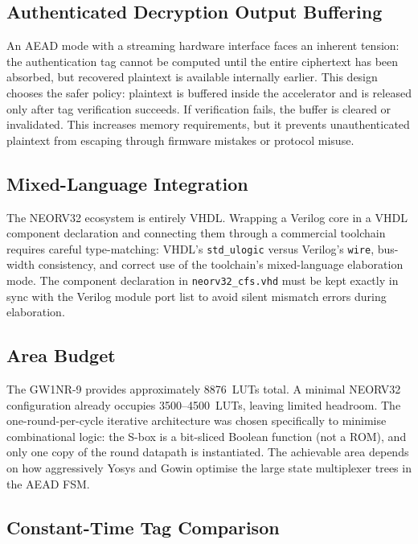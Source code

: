 \documentclass[11pt,a4paper]{article}
\begin{document}
\subsection{Authenticated Decryption Output Buffering}

An AEAD mode with a streaming hardware interface faces an inherent tension:
the authentication tag cannot be computed until the entire ciphertext has been
absorbed, but recovered plaintext is available internally earlier. This design
chooses the safer policy: plaintext is buffered inside the accelerator and is
released only after tag verification succeeds. If verification fails, the
buffer is cleared or invalidated. This increases memory requirements, but it
prevents unauthenticated plaintext from escaping through firmware mistakes or
protocol misuse.

\subsection{Mixed-Language Integration}

The NEORV32 ecosystem is entirely VHDL. Wrapping a Verilog core in a VHDL
component declaration and connecting them through a commercial toolchain
requires careful type-matching: VHDL's \texttt{std\_ulogic} versus Verilog's
\texttt{wire}, bus-width consistency, and correct use of the toolchain's
mixed-language elaboration mode. The component declaration in
\texttt{neorv32\_cfs.vhd} must be kept exactly in sync with the Verilog
module port list to avoid silent mismatch errors during elaboration.

\subsection{Area Budget}

The GW1NR-9 provides approximately 8876~LUTs total. A minimal NEORV32
configuration already occupies 3500--4500~LUTs, leaving limited headroom.
The one-round-per-cycle iterative architecture was chosen specifically to
minimise combinational logic: the S-box is a bit-sliced Boolean function
(not a ROM), and only one copy of the round datapath is instantiated.
The achievable area depends on how aggressively Yosys and Gowin optimise
the large state multiplexer trees in the AEAD FSM.

\subsection{Constant-Time Tag Comparison}
\end{document}
